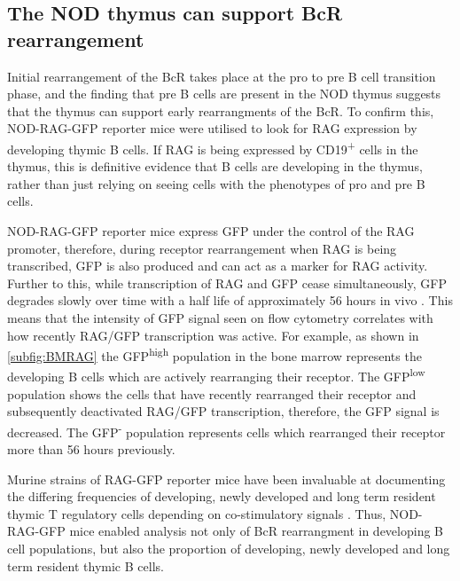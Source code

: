 



\subsection{The NOD thymus can support BcR rearrangement}

Initial rearrangement of the BcR takes place at the pro to pre B cell transition phase, and the finding that pre B cells are present in the NOD thymus suggests that the thymus can support early rearrangments of the BcR.
To confirm this, NOD-RAG-GFP reporter mice were utilised to look for RAG expression by developing thymic B cells.
If RAG is being expressed by CD19\textsuperscript{+} cells in the thymus, this is definitive evidence that B cells are developing in the thymus, rather than just relying on seeing cells with the phenotypes of pro and pre B cells.

NOD-RAG-GFP reporter mice express GFP under the control of the RAG promoter, therefore, during receptor rearrangement when RAG is being transcribed, GFP is also produced and can act as a marker for RAG activity.
Further to this, while transcription of RAG and GFP cease simultaneously, GFP degrades slowly over time with a half life of approximately 56 hours in vivo \citep{McCaughtry2007}.
This means that the intensity of GFP signal seen on flow cytometry correlates with how recently RAG/GFP transcription was active.
For example, as shown in \cref{subfig:BMRAG} the GFP\textsuperscript{high} population in the bone marrow represents the developing B cells which are actively rearranging their receptor.
The GFP\textsuperscript{low} population shows the cells that have recently rearranged their receptor and subsequently deactivated RAG/GFP transcription, therefore, the GFP signal is decreased.
The GFP\textsuperscript{-} population represents cells which rearranged their receptor more than 56 hours previously.

Murine strains of RAG-GFP reporter mice have been invaluable at documenting the differing frequencies of developing, newly developed and long term resident thymic T regulatory cells depending on co-stimulatory signals \citep{Cuss2012}.
Thus, NOD-RAG-GFP mice enabled analysis not only of BcR rearrangment in developing B cell populations, but also the proportion of developing, newly developed and long term resident thymic B cells.

